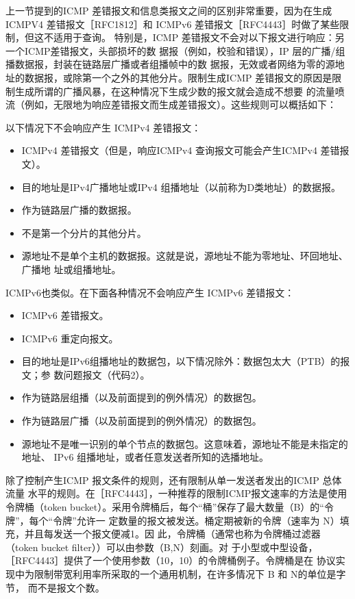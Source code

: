 上一节提到的ICMP 差错报文和信息类报文之间的区别非常重要，因为在生成ICMPV4
差错报文［RFC1812］和 ICMPv6 差错报文［RFC4443］时做了某些限制，但这不适用于查询。
特别是，ICMP 差错报文不会对以下报文进行响应：另一个ICMP差错报文，头部损坏的数
据报（例如，校验和错误），IP 层的广播/组播数据报，封装在链路层广播或者组播帧中的数
据报，无效或者网络为零的源地址的数据报，或除第一个之外的其他分片。限制生成ICMP
差错报文的原因是限制生成所谓的广播风暴，在这种情况下生成少数的报文就会造成不想要
的流量喷流（例如，无限地为响应差错报文而生成差错报文）。这些规则可以概括如下：

以下情况下不会响应产生 ICMPv4 差错报文：
\begin{itemize}
	\item ICMPv4 差错报文（但是，响应ICMPv4 查询报文可能会产生ICMPv4 差错报文）。
	\item 目的地址是IPv4广播地址或IPv4 组播地址（以前称为D类地址）的数据报。
	\item 作为链路层广播的数据报。
	\item 不是第一个分片的其他分片。
	\item 源地址不是单个主机的数据报。这就是说，源地址不能为零地址、环回地址、广播地
	      址或组播地址。
\end{itemize}

ICMPv6也类似。在下面各种情况不会响应产生 ICMPv6 差错报文：
\begin{itemize}
	\item ICMPv6 差错报文。
	\item ICMPv6 重定向报文。
	\item 目的地址是IPv6组播地址的数据包，以下情况除外：数据包太大（PTB）的报文；参
	      数问题报文（代码2）。
	\item 作为链路层组播（以及前面提到的例外情况）的数据包。
	\item 作为链路层广播（以及前面提到的例外情况）的数据包。
	\item 源地址不是唯一识别的单个节点的数据包。这意味着，源地址不能是未指定的地址、
	      IPv6 组播地址，或者任意发送者所知的选播地址。
\end{itemize}

除了控制产生ICMP 报文条件的规则，还有限制从单一发送者发出的ICMP 总体流量
水平的规则。在［RFC4443］，一种推荐的限制ICMP报文速率的方法是使用令牌桶（token
bucket）。采用令牌桶后，每个“桶”保存了最大数量（B）的“令牌”，每个“令牌”允许一
定数量的报文被发送。桶定期被新的令牌（速率为 N）填充，并且每发送一个报文便减1。因
此，令牌桶（通常也称为令牌桶过滤器 （token bucket filter））可以由参数（B,N）刻画。对
于小型或中型设备，［RFC4443］提供了一个使用参数（10，10）的令牌桶例子。令牌桶是在
协议实现中为限制带宽利用率所采取的一个通用机制，在许多情况下 B 和 N的单位是字节，
而不是报文个数。

